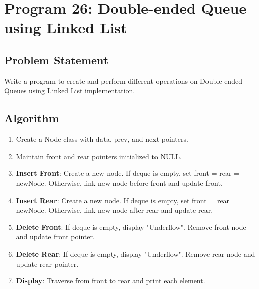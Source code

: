 \documentclass[a4paper,12pt]{article}
\begin{document}
\newpage

\section*{Program 26: Double-ended Queue using Linked List}

\subsection*{Problem Statement}
Write a program to create and perform different operations on Double-ended Queues using Linked List implementation.

\subsection*{Algorithm}
\begin{enumerate}
    \item Create a Node class with data, prev, and next pointers.
    \item Maintain front and rear pointers initialized to NULL.
    \item \textbf{Insert Front}: Create a new node. If deque is empty, set front = rear = newNode. Otherwise, link new node before front and update front.
    \item \textbf{Insert Rear}: Create a new node. If deque is empty, set front = rear = newNode. Otherwise, link new node after rear and update rear.
    \item \textbf{Delete Front}: If deque is empty, display "Underflow". Remove front node and update front pointer.
    \item \textbf{Delete Rear}: If deque is empty, display "Underflow". Remove rear node and update rear pointer.
    \item \textbf{Display}: Traverse from front to rear and print each element.
\end{enumerate}
\end{document}
